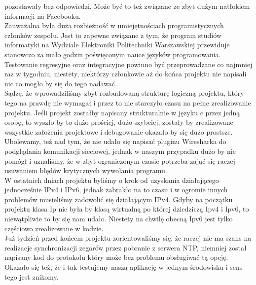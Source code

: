 \documentclass[10pt,a4paper]{article}
\begin{document}
pozostawały bez odpowiedzi. Może być to też związane ze zbyt dużym natłokiem informacji na Facebooku. \\
Zauważalna była duża rozbieżność w umiejętnościach programistycznych członków zespołu. Jest to zapewne związane z tym, że program studiów informatyki na Wydziale Elektroniki Politechniki Warszawskiej przewiduje stanowczo za mało
godzin poświęconym nauce języków programowania. \\
Testowanie regresyjne oraz integracyjne powinno być przeprowadzane co najmniej raz w tygodniu, niestety, niektórzy członkowie aż do końca projektu nie napisali nic co mogło by się do tego nadawać. \\
Sądzę, że wprowadziliśmy zbyt rozbudowaną strukturę logiczną projektu, który tego na prawdę nie wymagał i przez to nie starczyło czasu na pełne zrealizowanie projektu. Jeśli projekt zostałby napisany strukturalnie w języku c przez jedną
osobę, to wyszło by to dużo prościej, dużo szybciej, zostały by zrealizowane wszystkie założenia projektowe i debugowanie okazało by się dużo prostsze. \\
Ubolewamy, też nad tym, że nie udało się napisać pluginu Wiresharka do podglądania komunikacji sieciowej, jednak w naszym przypadku dużo by nie pomógł i uznaliśmy, że w zbyt ograniczonym czasie potrzeba zająć się raczej usuwaniem błędów
krytycznych wywołania programu. \\
W ostatnich dniach projektu byliśmy o krok od uzyskania działającego jednocześnie IPv4 i IPv6, jednak zabrakło na to czasu i w ogromie innych problemów musieliśmy zadowolić się działającym IPv4. Gdyby na początku projektu klasa Ip nie była
by klasą wirtualną po której dziedziczą Ipv4 i Ipv6, to niewątpliwie to by się nam udało. Niestety na chwilę obecną Ipv6 jest tylko częściowo zrealizowane w kodzie. \\
Już tydzień przed końcem projektu zorientowaliśmy się, że raczej nie ma szans na realizacje synchronizacji zegarów przez pobranie z serwera NTP, niemniej został napisany kod do protokołu który może bez problemu obsługiwać tą opcję. \\
Okazało się też, że i tak testujemy naszą aplikację w jednym środowisku i sens tego jest znikomy. \\
\end{document}
